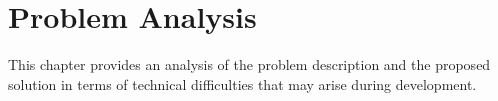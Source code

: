 \chapter{Problem Analysis} \label{cha:analysis}
	This chapter provides an analysis of the problem description and the 
	proposed solution in terms of technical difficulties that may arise during
	development.
	

	